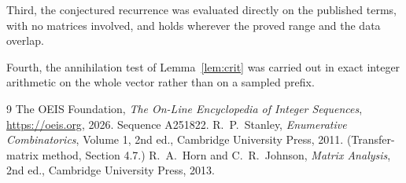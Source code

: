 \documentclass[11pt,a4paper]{article}
\theoremstyle{plain}
\theoremstyle{definition}
\begin{document}
Third, the conjectured recurrence was evaluated directly on the published terms, with no
matrices involved, and holds wherever the proved range and the data overlap.

Fourth, the annihilation test of Lemma~\ref{lem:crit} was carried out in exact integer
arithmetic on the whole vector rather than on a sampled prefix.

\begin{thebibliography}{9}
 The OEIS Foundation, \emph{The On-Line Encyclopedia of Integer
Sequences}, \url{https://oeis.org}, 2026. Sequence A251822.
 R.~P.~Stanley, \emph{Enumerative Combinatorics}, Volume 1, 2nd ed.,
Cambridge University Press, 2011. (Transfer-matrix method, Section 4.7.)
 R.~A.~Horn and C.~R.~Johnson, \emph{Matrix Analysis}, 2nd ed., Cambridge
University Press, 2013.
\end{thebibliography}
\end{document}
